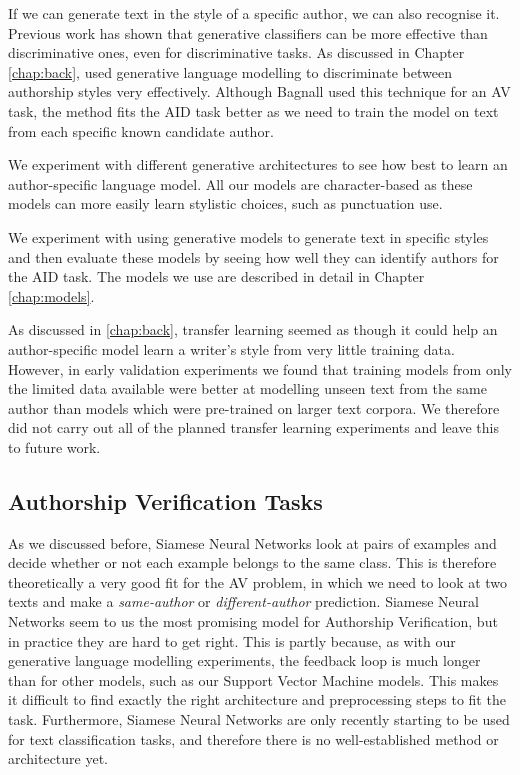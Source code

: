 If we can generate text in the style of a specific author, we can also recognise it. Previous work has shown that generative classifiers can be more effective than discriminative ones, even for discriminative tasks. As discussed in Chapter \ref{chap:back}, \citet{bagnall2015author} used generative language modelling to discriminate between authorship styles very effectively. Although Bagnall used this technique for an AV task, the method fits the AID task better as we need to train the model on text from each specific known candidate author. 

We experiment with different generative architectures to see how best to learn an author-specific language model. All our models are character-based as these models can more easily learn stylistic choices, such as punctuation use. 

We experiment with using generative models to generate text in specific styles and then evaluate these models by seeing how well they can identify authors for the AID task. The models we use are described in detail in Chapter \ref{chap:models}.

As discussed in \ref{chap:back}, transfer learning seemed as though it could help an author-specific model learn a writer's style from very little training data. However, in early validation experiments we found that training models from only the limited data available were better at modelling unseen text from the same author than models which were pre-trained on larger text corpora. We therefore did not carry out all of the planned transfer learning experiments and leave this to future work.

\subsection{Authorship Verification Tasks}
\label{method:nn-av}

As we discussed before, Siamese Neural Networks look at pairs of examples and decide whether or not each example belongs to the same class.
This is therefore theoretically a very good fit for the AV problem, in which we need to look at two texts and make a \textit{same-author} or 
\textit{different-author} prediction. Siamese Neural Networks seem to us the most promising model for Authorship Verification, but in practice they are hard to get right. 
This is partly because, as with our generative language modelling experiments, the feedback loop is much longer than for other models, such as our Support Vector Machine models.
This makes it difficult to find exactly the right architecture and preprocessing steps to fit the task. Furthermore, Siamese Neural Networks are only recently starting to be used 
for text classification tasks, and therefore there is no well-established method or architecture yet.

